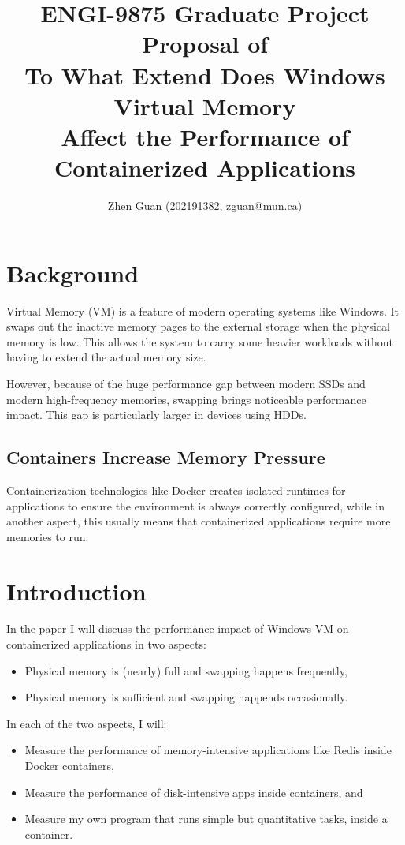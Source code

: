 \documentclass{article}
\title{ENGI-9875 Graduate Project Proposal of \\ \textbf{To What Extend Does Windows Virtual Memory \\ Affect the Performance of Containerized Applications}}
\author{Zhen Guan (202191382, zguan@mun.ca)}
\date{}
\begin{document}
\maketitle
\section{Background}

Virtual Memory (VM) is a feature of modern operating systems like Windows. It swaps out the inactive memory pages to the external storage when the physical memory is low. This allows the system to carry some heavier workloads without having to extend the actual memory size.

However, because of the huge performance gap\cite{6949047,8946136} between modern SSDs and modern high-frequency memories, swapping brings noticeable performance impact. This gap is particularly larger in devices using HDDs.

\subsection{Containers Increase Memory Pressure}

Containerization technologies like Docker creates isolated runtimes for applications to ensure the environment is always correctly configured, while in another aspect, this usually means that containerized applications require more memories to run. 


\section{Introduction}

In the paper I will discuss the performance impact of Windows VM on containerized applications in two aspects:

\begin{itemize}
    \item Physical memory is (nearly) full and swapping happens frequently,
    \item Physical memory is sufficient and swapping happends occasionally.
\end{itemize}

In each of the two aspects, I will:

\begin{itemize}
    \item Measure the performance of memory-intensive applications like Redis inside Docker containers,
    \item Measure the performance of disk-intensive apps inside containers, and
    \item Measure my own program that runs simple but quantitative tasks, inside a container.
\end{itemize}
\end{document}
